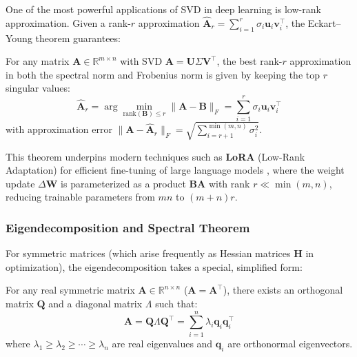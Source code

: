 One of the most powerful applications of SVD in deep learning is low-rank approximation. Given a rank-$r$ approximation $\hat{\mathbf{A}}_r = \sum_{i=1}^{r} \sigma_i \mathbf{u}_i \mathbf{v}_i^\top$, the Eckart--Young theorem guarantees:

\begin{theorem}
For any matrix $\mathbf{A} \in \mathbb{R}^{m \times n}$ with SVD $\mathbf{A} = \mathbf{U}\Sigma\mathbf{V}^\top$, the best rank-$r$ approximation in both the spectral norm and Frobenius norm is given by keeping the top $r$ singular values:
\begin{equation}
\hat{\mathbf{A}}_r = \arg\min_{\text{rank}(\mathbf{B}) \leq r} \|\mathbf{A} - \mathbf{B}\|_F = \sum_{i=1}^{r} \sigma_i \mathbf{u}_i \mathbf{v}_i^\top
\end{equation}
with approximation error $\|\mathbf{A} - \hat{\mathbf{A}}_r\|_F = \sqrt{\sum_{i=r+1}^{\min(m,n)} \sigma_i^2}$.
\end{theorem}

This theorem underpins modern techniques such as \textbf{LoRA} (Low-Rank Adaptation) for efficient fine-tuning of large language models \cite{hu2021lora}, where the weight update $\Delta\mathbf{W}$ is parameterized as a product $\mathbf{B}\mathbf{A}$ with rank $r \ll \min(m, n)$, reducing trainable parameters from $mn$ to $(m + n)r$.

\subsubsection{Eigendecomposition and Spectral Theorem}

For symmetric matrices (which arise frequently as Hessian matrices $\mathbf{H}$ in optimization), the eigendecomposition takes a special, simplified form:

\begin{theorem}
For any real symmetric matrix $\mathbf{A} \in \mathbb{R}^{n \times n}$ ($\mathbf{A} = \mathbf{A}^\top$), there exists an orthogonal matrix $\mathbf{Q}$ and a diagonal matrix $\Lambda$ such that:
\begin{equation}
\mathbf{A} = \mathbf{Q}\Lambda\mathbf{Q}^\top = \sum_{i=1}^{n} \lambda_i \mathbf{q}_i \mathbf{q}_i^\top
\end{equation}
where $\lambda_1 \geq \lambda_2 \geq \cdots \geq \lambda_n$ are real eigenvalues and $\mathbf{q}_i$ are orthonormal eigenvectors.
\end{theorem}

